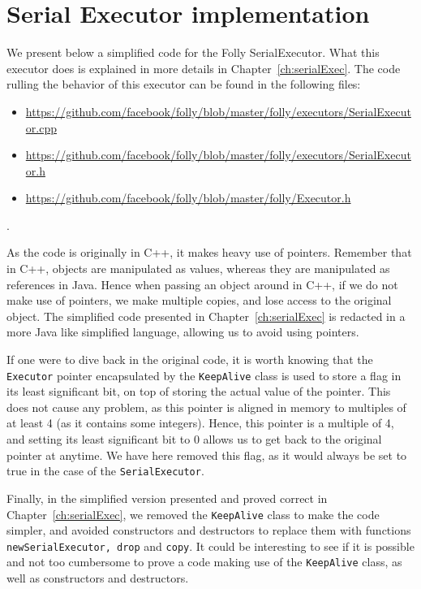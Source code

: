 \chapter{Serial Executor implementation}
\label{app:serialExec}
We present below a simplified code for the Folly SerialExecutor. What this executor does is explained in more details in Chapter~\ref{ch:serialExec}. The code rulling the behavior of this executor can be found in the following files:
\begin{itemize}
	\item \url{https://github.com/facebook/folly/blob/master/folly/executors/SerialExecutor.cpp}
	\item \url{https://github.com/facebook/folly/blob/master/folly/executors/SerialExecutor.h}
	\item \url{https://github.com/facebook/folly/blob/master/folly/Executor.h}
\end{itemize}. 

As the code is originally in C++, it makes heavy use of pointers. Remember that in C++, objects are manipulated as values, whereas they are manipulated as references in Java. Hence when passing an object around in C++, if we do not make use of pointers, we make multiple copies, and lose access to the original object. The simplified code presented in Chapter~\ref{ch:serialExec} is redacted in a more Java like simplified language, allowing us to avoid using pointers.

If one were to dive back in the original code, it is worth knowing that the \texttt{Executor} pointer encapsulated by the \texttt{KeepAlive} class is used to store a flag in its least significant bit, on top of storing the actual value of the pointer. This does not cause any problem, as this pointer is aligned in memory to multiples of at least 4 (as it contains some integers). Hence, this pointer is a multiple of 4, and setting its least significant bit to 0 allows us to get back to the original pointer at anytime. We have here removed this flag, as it would always be set to true in the case of the \texttt{SerialExecutor}.

Finally, in the simplified version presented and proved correct in Chapter~\ref{ch:serialExec}, we removed the \texttt{KeepAlive} class to make the code simpler, and avoided constructors and destructors to replace them with functions \texttt{newSerialExecutor, drop} and \texttt{copy}. It could be interesting to see if it is possible and not too cumbersome to prove a code making use of the \texttt{KeepAlive} class, as well as constructors and destructors.

